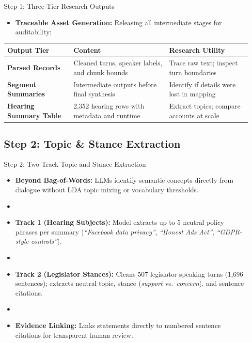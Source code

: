 \documentclass[xcolor=x11names,compress,9pt]{beamer}
\renewcommand{\(}{\begin{columns}}
\renewcommand{\)}{\end{columns}}
\newcommand{\<}[1]{\begin{column}{#1}}
\renewcommand{\>}{\end{column}}
\begin{document}
\begin{frame}{Step 1: Three-Tier Research Outputs}
    \begin{itemize}
        \item \textbf{Traceable Asset Generation:} Releasing all intermediate stages for auditability:
    \end{itemize}
    \vspace{0.2cm}
    \centering
    \scriptsize
    \begin{tabular}{p{2.4cm}p{3.8cm}p{3.8cm}}
        \toprule
        \textbf{Output Tier} & \textbf{Content} & \textbf{Research Utility} \\
        \midrule
        \textbf{Parsed Records} & Cleaned turns, speaker labels, and chunk bounds & Trace raw text; inspect turn boundaries \\
        \addlinespace
        \textbf{Segment Summaries} & Intermediate outputs before final synthesis & Identify if details were lost in mapping \\
        \addlinespace
        \textbf{Hearing Summary Table} & 2,352 hearing rows with metadata and runtime & Extract topics; compare accounts at scale \\
        \bottomrule
    \end{tabular}
\end{frame}

\subsection{Step 2: Topic \& Stance Extraction}

\begin{frame}{Step 2: Two-Track Topic and Stance Extraction}
    \begin{itemize}
        \item \textbf{Beyond Bag-of-Words:} LLMs identify semantic concepts directly from dialogue without LDA topic mixing or vocabulary thresholds.
        \item []
        \item \textbf{Track 1 (Hearing Subjects):} Model extracts up to 5 neutral policy phrases per summary (\textit{``Facebook data privacy''}, \textit{``Honest Ads Act''}, \textit{``GDPR-style controls''}).
        \item []
        \item \textbf{Track 2 (Legislator Stances):} Cleans 507 legislator speaking turns (1,696 sentences); extracts neutral topic, stance (\textit{support} vs.\ \textit{concern}), and sentence citations.
        \item []
        \item \textbf{Evidence Linking:} Links statements directly to numbered sentence citations for transparent human review.
    \end{itemize}
\end{frame}
\end{document}
